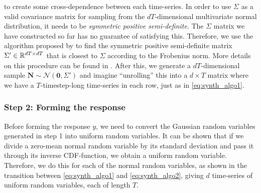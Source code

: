 \documentclass{statsmsc}
\begin{document}
{to create some cross-dependence between each time-series.
In order to use $\Sigma$ as a valid covariance matrix for sampling from the
$dT$-dimensional
multivariate normal distribution, it needs to be
\textit{symmetric positive semi-definite}. The $\Sigma$ matrix we have constructed so far has no
guarantee of satisfying this. Therefore, we use the algorithm proposed by
\cite{nearest_psd} to find the symmetric positive semi-definite matrix
$\Sigma' \in \mathbb{R}^{dT \times dT}$ that is closest to $\Sigma$ according to the Frobenius norm.
More details on this procedure can be found in \cite{nearest_psd}.
After this, we generate a $dT$-dimensional sample $\mathbf{N} \sim
\mathcal{N}(\mathbf{0}, \Sigma')$ and imagine ``unrolling'' this into a
$d\times T$ matrix where we have a $T$-timestep-long time-series in each row,
just as in \cref{eq:synth_algo1}.

\subsubsection{Step 2: Forming the response}%
\label{ssub:Step 2: Forming the response}

Before forming the response $y$, we need to convert the Gaussian random variables generated in
step 1 into uniform random variables. It can be shown that if we divide a zero-mean normal random
variable by its standard deviation and pass it through its inverse \ac{CDF}-function, we obtain
a uniform random variable. Therefore, we do this for each of the normal random variables, as shown
in the transition between \cref{eq:synth_algo1} and \cref{eq:synth_algo2}, giving $d$ time-series
of uniform random variables, each of length $T$.

}
\end{document}
